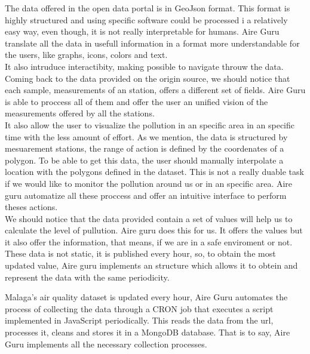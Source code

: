 The data offered in the open data portal is in GeoJson format. This format is highly structured and using specific software could be
processed i a relatively easy way, even though, it is not really interpretable for humans. Aire Guru translate all the 
data in usefull information in a format more understandable for the users, like graphs, icons, colors and text.\\

It also intruduce interactibity, making possible to navigate throuw the data.\\

Coming back to the data provided on the origin source, we should notice that each sample, measurements of an station, offers a different
set of fields. Aire Guru is able to proccess all of them and offer the user an unified vision of the measurements offered by
all the stations.\\

It also allow the user to visualize the pollution in an specific area in an specific time with the less amount of effort.
As we mention, the data is structured by mesuarement stations, the range of action is defined by the coordenates of 
a polygon. To be able to get this data, the user should manually interpolate a location with the polygons defined in the dataset.
This is not a really duable task if we would like to monitor the pollution around us or in an specific area. Aire guru
automatize all these proccess and offer an intuitive interface to perform theses actions.\\

We should notice that the data provided contain a set of values will help us to calculate the level of pullution. Aire guru
does this for us. It offers the values but it also offer the information, that means, if we are in a safe enviroment or not.\\

These data is not static, it is published every hour, so, to obtain the most updated value, Aire guru implements an structure
which allows it to obtein and represent the data with the same periodicity.

Malaga's air quality dataset is updated every hour, Aire Guru automates the process of collecting the
data through a CRON job that executes a script implemented in JavaScript periodically. This reads the data from the url, processes it,
cleans and stores it in a MongoDB database. That is to say, Aire Guru implements all the necessary collection processes.\\

